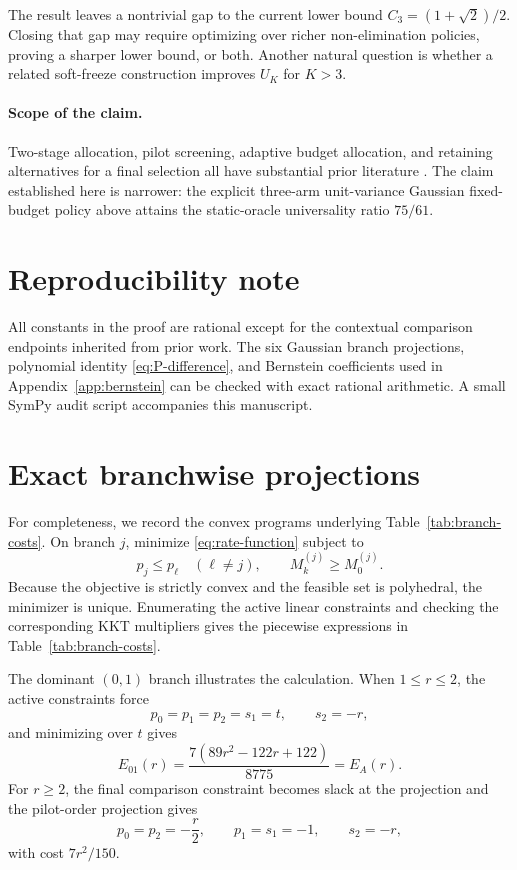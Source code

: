 \documentclass[11pt]{article}
\theoremstyle{definition}
\theoremstyle{remark}
\begin{document}
The result leaves a nontrivial gap to the current lower bound $C_3=(1+\sqrt2)/2$. Closing that gap may require optimizing over richer non-elimination policies, proving a sharper lower bound, or both. Another natural question is whether a related soft-freeze construction improves $U_K$ for $K>3$.

\paragraph{Scope of the claim.}
Two-stage allocation, pilot screening, adaptive budget allocation, and retaining alternatives for a final selection all have substantial prior literature \cite{chen2000,kato2026}. The claim established here is narrower: the explicit three-arm unit-variance Gaussian fixed-budget policy above attains the static-oracle universality ratio $75/61$.

\section*{Reproducibility note}
All constants in the proof are rational except for the contextual comparison endpoints inherited from prior work. The six Gaussian branch projections, polynomial identity \eqref{eq:P-difference}, and Bernstein coefficients used in Appendix~\ref{app:bernstein} can be checked with exact rational arithmetic. A small SymPy audit script accompanies this manuscript.

\appendix

\section{Exact branchwise projections}
\label{app:projections}

For completeness, we record the convex programs underlying Table~\ref{tab:branch-costs}. On branch $j$, minimize \eqref{eq:rate-function} subject to
\[
p_j\le p_\ell\quad(\ell\ne j),
\qquad
M_k^{(j)}\ge M_0^{(j)}.
\]
Because the objective is strictly convex and the feasible set is polyhedral, the minimizer is unique. Enumerating the active linear constraints and checking the corresponding KKT multipliers gives the piecewise expressions in Table~\ref{tab:branch-costs}.

The dominant $(0,1)$ branch illustrates the calculation. When $1\le r\le2$, the active constraints force
\[
p_0=p_1=p_2=s_1=t,
\qquad s_2=-r,
\]
and minimizing over $t$ gives
\[
E_{01}(r)=\frac{7(89r^2-122r+122)}{8775}=E_A(r).
\]
For $r\ge2$, the final comparison constraint becomes slack at the projection and the pilot-order projection gives
\[
p_0=p_2=-\frac r2,
\qquad p_1=s_1=-1,
\qquad s_2=-r,
\]
with cost $7r^2/150$.
\end{document}
